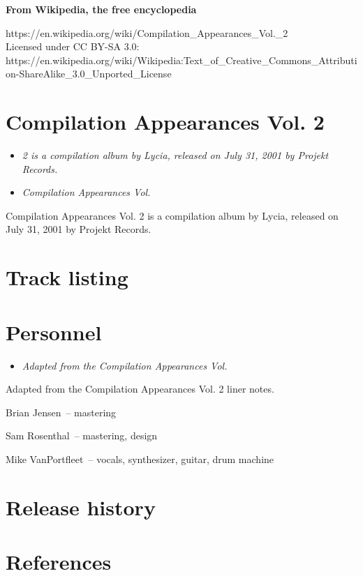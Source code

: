 \textbf{From Wikipedia, the free encyclopedia}

https://en.wikipedia.org/wiki/Compilation\_Appearances\_Vol.\_2\\
Licensed under CC BY-SA 3.0:\\
https://en.wikipedia.org/wiki/Wikipedia:Text\_of\_Creative\_Commons\_Attribution-ShareAlike\_3.0\_Unported\_License

\section{Compilation Appearances Vol.
2}\label{compilation-appearances-vol.-2}

\begin{itemize}
\item
  \emph{2 is a compilation album by Lycia, released on July 31, 2001 by
  Projekt Records.}
\item
  \emph{Compilation Appearances Vol.}
\end{itemize}

Compilation Appearances Vol. 2 is a compilation album by Lycia, released
on July 31, 2001 by Projekt Records.

\section{Track listing}\label{track-listing}

\section{Personnel}\label{personnel}

\begin{itemize}
\item
  \emph{Adapted from the Compilation Appearances Vol.}
\end{itemize}

Adapted from the Compilation Appearances Vol. 2 liner notes.

Brian Jensen~-- mastering

Sam Rosenthal~-- mastering, design

Mike VanPortfleet~-- vocals, synthesizer, guitar, drum machine

\section{Release history}\label{release-history}

\section{References}\label{references}
